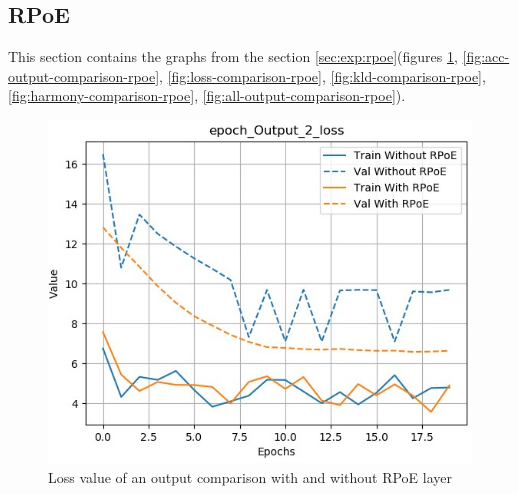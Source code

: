 \documentclass[12pt]{report}
\begin{document}
\subsection{RPoE}
\label{appendix:exp:rpoe}

This section contains the graphs from the section \ref{sec:exp:rpoe}(figures \ref{fig:loss-output-comparison-rpoe}, \ref{fig:acc-output-comparison-rpoe}, \ref{fig:loss-comparison-rpoe}, \ref{fig:kld-comparison-rpoe}, \ref{fig:harmony-comparison-rpoe}, \ref{fig:all-output-comparison-rpoe}).


\begin{figure}[htbp]
    \begin{minipage}{0.5\textwidth}
        \begin{center}
            \includegraphics[width=\textwidth]{images/experiences/rpoe-rnn/loss-output-comparison-rpoe.jpg}
            \caption{Loss value of an output comparison with and without RPoE layer}
            \label{fig:loss-output-comparison-rpoe}
        \end{center}
    \end{minipage} \hfill
    \begin{minipage}{0.5 \textwidth}
        \begin{center}

\end{center}
\end{minipage}
\end{figure}
\end{document}
